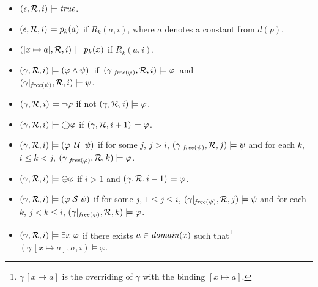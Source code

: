 \begin{itemize}

\item $( \epsilon , {\cal R} , i ) \models \mathit{true}$.

\item $( \epsilon ,  {\cal R} , i )
 \models p_k ( a ) $ if $R_k ( a, i )$, where $a$ denotes a constant from  $d(p)$.

\item $( [ x \mapsto a ] , {\cal R} , i ) \models p_k ( x )$ if $R_k ( a , i )$.

\item $( \gamma,  {\cal R} , i ) \models ( \varphi \wedge \psi ) $~if~$(
\gamma |_{\mathit{free}  ( \varphi )} , {\cal R} , i ) \models \varphi$~and  \\
$( \gamma |_{\mathit{free} ( \psi ) } , {\cal R} , i ) \models \psi$. 

\item $( \gamma , {\cal R} , i ) \models \neg \varphi$ if not $( \gamma , {\cal R} , i ) 
\models \varphi$.

\item $( \gamma , {\cal R} , i) \models \bigcirc \varphi$ if 
$(\gamma , {\cal R} , i + 1) \models
\varphi$.

\item $( \gamma , {\cal R} , i ) \models ( \varphi \; \mathbin{\mathcal{U}} \; \psi )$ if
for some $j$, $j > i$, $( \gamma |_{\mathit{free} ( \psi )} , {\cal R} , j) 
\models \psi $ and for each $k$,  $i \leq k < j $,
$( \gamma |_{\mathit{free} ( \varphi )} , {\cal R} , k) \models \varphi$.


\item $( \gamma , {\cal R} , i) \models \ominus \varphi$ if $i>1$ and
$(\gamma , {\cal R} , i-1) \models
\varphi$.

\item $( \gamma , {\cal R} , i ) \models ( \varphi \; {\cal S} \; \psi )$ if
for some $j$, $1 \le j \leq i$, $( \gamma |_{\mathit{free} ( \psi )} , {\cal R} , j) 
\models \psi $ and for each $k$, $j < k \leq i$,
$( \gamma |_{\mathit{free} ( \varphi )} , {\cal R} , k) \models \varphi$.





\item $( \gamma , {\cal R} , i) \models \exists x \; \varphi$ if
there exists $a \in \mathit{domain} ( x )$ such that\footnote{$\gamma \, [ x \mapsto a ]$
is the overriding of $\gamma$ with the binding $[ x \mapsto a ]$.}
$( \gamma \, [ x \mapsto a ], \sigma , i) \models \varphi$.

\end{itemize}

